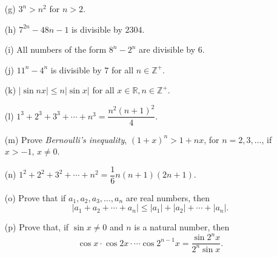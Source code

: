 \documentclass[titlepage,a4paper,12pt]{report}
\begin{document}
\begin{enumerate}
\begin{itemize}
\item[(g)] $3^n>n^2$ for $n>2$.
\item[(h)] $7^{2n}-48n-1$ is divisible by $2304$.
\item[(i)] All numbers of the form $8^n-2^n$ are divisible by $6$.
\item[(j)] $11^n-4^n$ is divisible by $7$ for all $n \in \mathbb{Z ^+}$.
\item[(k)] $|\sin nx| \leq n|\sin x|$ for all $x \in \mathbb{R}, n \in \mathbb{Z ^+}$.
\item[(l)] $1^3+2^3+3^3+\cdots +n^3=\dfrac{n^2(n+1)^2}{4}$.
\item[(m)] Prove \textit{Bernoulli's inequality}, $(1+x)^n>1+nx$, for $n=2,3,\dots$, if $x>-1, \, x\neq 0$.
\item[(n)] $1^2+2^2+3^2+\cdots +n^2=\dfrac{1}{6}n(n+1)(2n+1)$.
\item[(o)] Prove that if $a_1, a_2, a_3, \dots , a_n$ are real numbers, then 
\begin{equation*}
|a_1+a_2+\cdots +a_n|\leq |a_1| +|a_2|+\cdots +|a_n|.
\end{equation*}
\item[(p)] Prove that, if $\sin x \neq 0$ and $n$ is a natural number, then 
\begin{equation*}
\cos x \cdot \cos 2x \cdot \cdots \cos 2^{n-1} x =\dfrac{\sin 2^n x}{2^n\sin x}.
\end{equation*} 
\end{itemize}
\end{enumerate}
\end{document}
